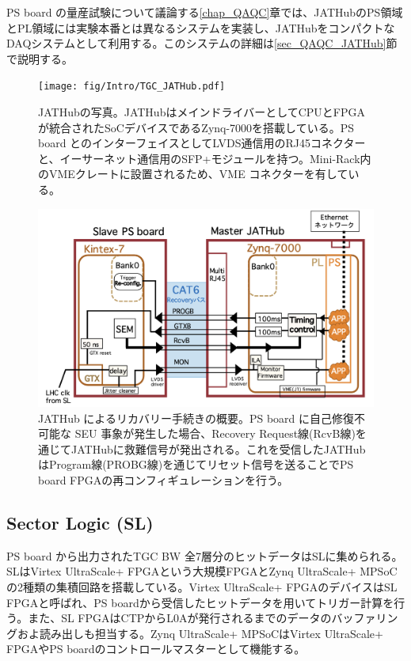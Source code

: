     PS board の量産試験について議論する\ref{chap_QAQC}章では、JATHubのPS領域とPL領域には実験本番とは異なるシステムを実装し、JATHubをコンパクトなDAQシステムとして利用する。このシステムの詳細は\ref{sec_QAQC_JATHub}節で説明する。



    \begin{figure} 
        \centering
        \texttt{[image: fig/Intro/TGC\_JATHub.pdf]}
        \caption[JATHubの写真]{JATHubの写真\cite{mt_aoki}。JATHubはメインドライバーとしてCPUとFPGAが統合されたSoCデバイスであるZynq-7000を搭載している。PS board とのインターフェイスとしてLVDS通信用のRJ45コネクターと、イーサーネット通信用のSFP+モジュールを持つ。Mini-Rack内のVMEクレートに設置されるため、VME コネクターを有している。}
        \label{TGC_JATHub}
    \end{figure}

    \begin{figure} 
    \centering
    \includegraphics[width=16cm]{fig/QAQC/JATHubsem.png}
    \caption[JATHub によるリカバリー手続きの概要]{JATHub によるリカバリー手続きの概要\cite{mt_atanaka}。PS board に自己修復不可能な SEU 事象が発生した場合、Recovery Request線(RcvB線)を通じてJATHubに救難信号が発出される。これを受信したJATHubはProgram線(PROBG線)を通じてリセット信号を送ることでPS board FPGAの再コンフィギュレーションを行う。}
    \label{JATHubsem}
    \end{figure}

        \subsection*{Sector Logic  (SL) }
PS board から出力されたTGC BW 全7層分のヒットデータはSLに集められる。SLはVirtex UltraScale+ FPGAという大規模FPGAとZynq UltraScale+ MPSoCの2種類の集積回路を搭載している。Virtex UltraScale+ FPGAのデバイスはSL FPGAと呼ばれ、PS boardから受信したヒットデータを用いてトリガー計算を行う。また、SL FPGAはCTPからL0Aが発行されるまでのデータのバッファリングおよ読み出しも担当する。Zynq UltraScale+ MPSoCはVirtex UltraScale+ FPGAやPS boardのコントロールマスターとして機能する。

